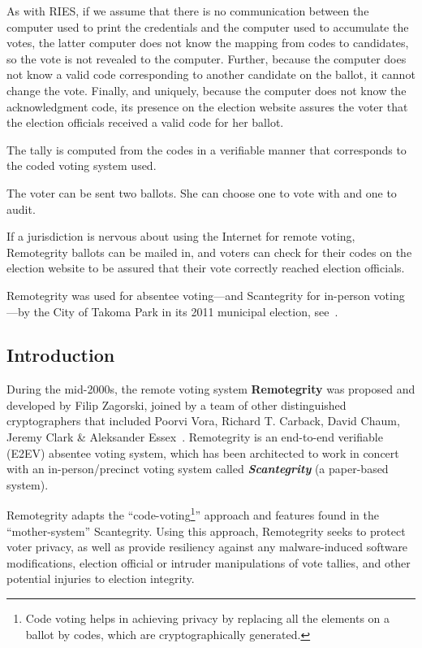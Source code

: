 As with RIES, if we assume that there is no communication between the
computer used to print the credentials and the computer used to
accumulate the votes, the latter computer does not know the mapping
from codes to candidates, so the vote is not revealed to the
computer. Further, because the computer does not know a valid code
corresponding to another candidate on the ballot, it cannot change the
vote. Finally, and uniquely, because the computer does not know the
acknowledgment code, its presence on the election website assures the
voter that the election officials received a valid code for her
ballot.

The tally is computed from the codes in a verifiable manner that
corresponds to the coded voting system used.

The voter can be sent two ballots. She can choose one to vote with and
one to audit.

If a jurisdiction is nervous about using the Internet for remote
voting, Remotegrity ballots can be mailed in, and voters can check for
their codes on the election website to be assured that their vote
correctly reached election officials.

Remotegrity was used for absentee voting---and Scantegrity for
in-person voting---by the City of Takoma Park in its 2011 municipal
election, see~\cite{zagorski2013}.

\subsection{Introduction}

During the mid-2000s, the remote voting system \textbf{Remotegrity
}was proposed and developed by Filip Zagorski, joined by a team of
other distinguished cryptographers that included Poorvi Vora, Richard
T. Carback, David Chaum, Jeremy Clark \& Aleksander
Essex~\cite{zagorski2013}. Remotegrity is an end-to-end verifiable
(E2EV) absentee voting system, which has been architected to work in
concert with an in-person/precinct voting system called
\textbf{\textit{Scantegrity }}(a paper-based system).

Remotegrity adapts the ``code-voting\footnote{Code voting helps in
  achieving privacy by replacing all the elements on a ballot by
  codes, which are cryptographically generated.}'' approach and
features found in the ``mother-system'' Scantegrity. Using this
approach, Remotegrity seeks to protect voter privacy, as well as
provide resiliency against any malware-induced software modifications,
election official or intruder manipulations of vote tallies, and other
potential injuries to election integrity.


